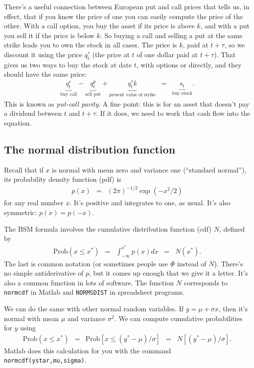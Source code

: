 \documentclass[11pt]{article}
\begin{document}
There's a useful connection between European put and call prices
that tells us, in effect, that if you know the price of one you can
easily compute the price of the other.
With a call option, you buy the asset if its price is above $k$,
and with a put you sell it if the price is below $k$.
So buying a call and selling a put at the same strike leads you to own the stock in all cases.
The price is $k$, paid at $t+\tau$, so we discount it using
the price $q^\tau_t$ (the price at $t$ of one dollar paid at $t+\tau$).
That gives us two ways to buy the stock at date $t$, with options or directly,
and they should have the same price:
\begin{eqnarray*}
    \underbrace{q^c_t}_{\mbox{buy call}} -
    \underbrace{q^p_t}_{\mbox{sell put}} +
    \underbrace{q^\tau_t k}_{\mbox{present value of strike}}
    &=&
    \underbrace{s_t}_{\mbox{buy stock}} .
    \label{eq:put-call-parity}
\end{eqnarray*}
This is known as {\it put-call parity\/}.
A fine point:  this is for an asset that doesn't pay a dividend
between $t$ and $t+\tau$.
If it does, we need to work that cash flow into the equation.


\subsection*{The normal distribution function}


Recall that if $x$ is normal with mean zero and variance one (``standard normal''),
its probability density function (pdf) is
\begin{eqnarray*}
    p(x) &=& (2 \pi)^{-1/2} \exp(-x^2/2)
\end{eqnarray*}
for any real number $x$.
It's positive and integrates to one, as usual.
It's also symmetric:  $p(x) = p(-x)$.

The BSM formula involves the cumulative distribution function (cdf) $N$,
defined by
\begin{eqnarray*}
    \mbox{Prob} (x \leq x^*)  &=& \int_{-\infty}^{x^*} p(x) dx
        \;\;=\;\; N(x^*).
\end{eqnarray*}
The last is common notation (or sometimes people use $\Phi$ instead of $N$).
There's no simple antiderivative of $p$, but it comes up enough that
we give it a letter.
It's also a common function in lots of software.
The function $N$ corresponds to {\tt normcdf} in Matlab
and {\tt NORMSDIST} in spreadsheet programs.

We can do the same with other normal random variables.
If $ y = \mu + \sigma x$,
then it's normal with mean $\mu$ and variance $\sigma^2$.
We can compute cumulative probabilities for $y$ using
\begin{eqnarray*}
    \mbox{Prob} (x \leq x^*)  &=& \mbox{Prob} [x \leq (y^*-\mu)/\sigma ]
        \;\;=\;\; N\left[ (y^*-\mu)/\sigma \right].
\end{eqnarray*}
Matlab does this calculation for you with the command {\tt normcdf(ystar,mu,sigma)}.
\end{document}
